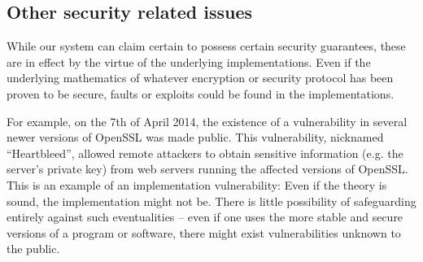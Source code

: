 \subsection{Other security related issues}
While our system can claim certain to possess certain security guarantees, these are in effect by the virtue of the underlying implementations.
Even if the underlying mathematics of whatever encryption or security protocol has been proven to be secure, faults or exploits could be found in the implementations.

For example, on the 7th of April 2014, the existence of a vulnerability in several newer versions of OpenSSL was made public.
This vulnerability, nicknamed ``Heartbleed'', allowed remote attackers to obtain sensitive information (e.g. the server's private key) from web servers running the affected versions of OpenSSL.
This is an example of an implementation vulnerability: Even if the theory is sound, the implementation might not be.
There is little possibility of safeguarding entirely against such eventualities -- even if one uses the more stable and secure versions of a program or software, there might exist vulnerabilities unknown to the public.
